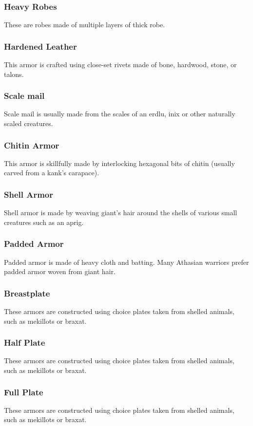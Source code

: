 \begin{multicols}{2}

\subsubsection{Heavy Robes}
\label{itmamr:heavyrobes}
These are robes made of multiple layers of thick robe.

\subsubsection{Hardened Leather}
\label{itmamr:hardenedleather}
This armor is crafted using close-set rivets made of bone, hardwood, stone, or talons.

\subsubsection{Scale mail}
\label{itmamr:scalemail}
Scale mail is usually made from the scales of an erdlu, inix or other naturally scaled creatures.

\subsubsection{Chitin Armor}
\label{itmamr:chitinarmor}
This armor is skillfully made by interlocking hexagonal bits of chitin (usually carved from a kank’s carapace).

\subsubsection{Shell Armor}
\label{itmamr:shellarmor}
Shell armor is made by weaving giant's hair around the shells of various small creatures such as an aprig.

\subsubsection{Padded Armor}
\label{itmamr:paddedarmor}
Padded armor is made of heavy cloth and batting. Many Athasian warriors prefer padded armor woven from giant hair.

\subsubsection{Breastplate}
\label{itmamr:breastplate}
These armors are constructed using choice plates taken from shelled animals, such as mekillots or braxat.

\subsubsection{Half Plate}
\label{itmamr:halfplate}
These armors are constructed using choice plates taken from shelled animals, such as mekillots or braxat.

\subsubsection{Full Plate}
\label{itmamr:fullplate}
These armors are constructed using choice plates taken from shelled animals, such as mekillots or braxat.

\end{multicols}
